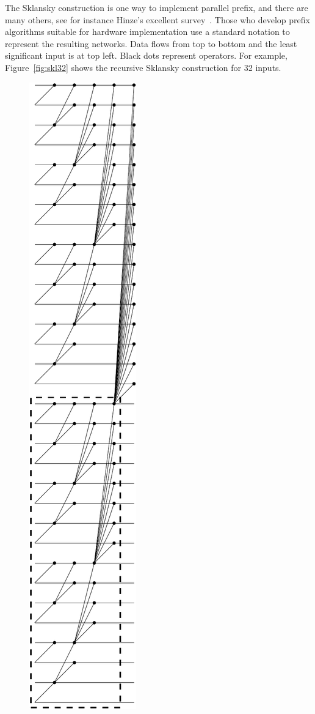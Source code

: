 The Sklansky construction is one way to implement parallel prefix, and there are many others, see for instance Hinze's excellent survey~\cite{Hinze}.
Those who develop prefix algorithms suitable for hardware implementation use a standard notation to represent
the resulting networks. Data flows from top to bottom and
the least significant input is at top left. Black dots represent
operators.
For example, Figure~\ref{fig:skl32} shows the
recursive Sklansky construction for 32 inputs. 
%
\begin{figure}%
\begin{center}
\includegraphics[bb=0 0 123 748, angle=270, scale=0.4]{./ifl/skl32.pdf}

\end{center}
\end{figure}

